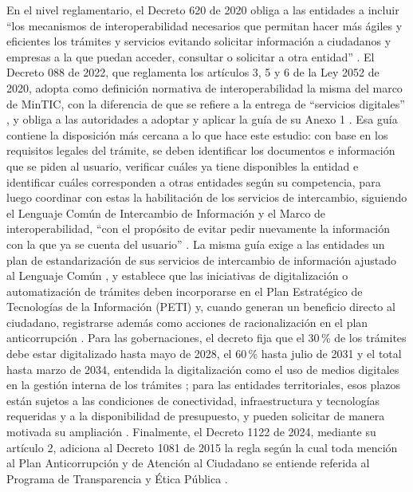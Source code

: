 En el nivel reglamentario, el Decreto 620 de 2020 obliga a las entidades a incluir \enquote{los mecanismos de interoperabilidad necesarios que permitan hacer más ágiles y eficientes los trámites y servicios evitando solicitar información a ciudadanos y empresas a la que puedan acceder, consultar o solicitar a otra entidad} \parencite[art.~2.2.17.4.7, num.~8]{colombia2020decreto620}. El Decreto 088 de 2022, que reglamenta los artículos 3, 5 y 6 de la Ley 2052 de 2020, adopta como definición normativa de interoperabilidad la misma del marco de MinTIC, con la diferencia de que se refiere a la entrega de \enquote{servicios digitales} \parencite[art.~2.2.20.3, num.~8]{colombia2022decreto088}, y obliga a las autoridades a adoptar y aplicar la guía de su Anexo 1 \parencite[art.~2.2.20.4]{colombia2022decreto088}. Esa guía contiene la disposición más cercana a lo que hace este estudio: con base en los requisitos legales del trámite, se deben identificar los documentos e información que se piden al usuario, verificar cuáles ya tiene disponibles la entidad e identificar cuáles corresponden a otras entidades según su competencia, para luego coordinar con estas la habilitación de los servicios de intercambio, siguiendo el Lenguaje Común de Intercambio de Información y el Marco de interoperabilidad, \enquote{con el propósito de evitar pedir nuevamente la información con la que ya se cuenta del usuario} \parencite[Anexo 1, num.~2.3.3.1.5]{colombia2022decreto088}. La misma guía exige a las entidades un plan de estandarización de sus servicios de intercambio de información ajustado al Lenguaje Común \parencite[Anexo 1, num.~2.4.2]{colombia2022decreto088}, y establece que las iniciativas de digitalización o automatización de trámites deben incorporarse en el Plan Estratégico de Tecnologías de la Información (PETI) y, cuando generan un beneficio directo al ciudadano, registrarse además como acciones de racionalización en el plan anticorrupción \parencite[Anexo 1, num.~2.3.2]{colombia2022decreto088}. Para las gobernaciones, el decreto fija que el 30\,\% de los trámites debe estar digitalizado hasta mayo de 2028, el 60\,\% hasta julio de 2031 y el total hasta marzo de 2034, entendida la digitalización como el uso de medios digitales en la gestión interna de los trámites \parencite[arts. 2.2.20.3, num.~3, y 2.2.20.7]{colombia2022decreto088}; para las entidades territoriales, esos plazos están sujetos a las condiciones de conectividad, infraestructura y tecnologías requeridas y a la disponibilidad de presupuesto, y pueden solicitar de manera motivada su ampliación \parencite[art.~2.2.20.6, num.~3]{colombia2022decreto088}. Finalmente, el Decreto 1122 de 2024, mediante su artículo 2, adiciona al Decreto 1081 de 2015 la regla según la cual toda mención al Plan Anticorrupción y de Atención al Ciudadano se entiende referida al Programa de Transparencia y Ética Pública \parencite[art.~2]{colombia2024decreto1122}.

